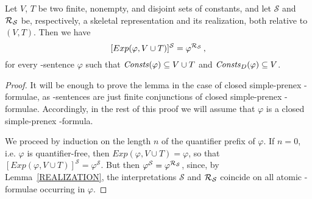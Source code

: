 \documentclass[a4paper]{llncs}
\newcommand{\HExp}{Exp}
\newcommand{\atset}{\mathcal{S}}
\newcommand{\DomConsts}{\Consts_D}
\begin{document}
\begin{lemma}\label{SKREAL}
Let $V$, $T$ be two finite, nonempty, and disjoint sets of constants, and let
$\atset$ and $\Realization_{\!\atset}$ be, respectively, a skeletal 
representation and
its realization, both relative to $(V,T)$.
Then we have
\[
  [\HExp(\varphi, V \cup T)]^{\atset} = \varphi^{\Realization_{\!\atset}} \,,
\]
for every \Forallpizero-sentence $\varphi$ such that 
$\mathit{Consts}(\varphi) \subseteq V \cup T$
and $\DomConsts(\varphi) \subseteq V$.
\end{lemma}
\begin{proof}
It will be enough to prove the lemma in the case of closed simple-prenex
\Forallpizero-formulae, as \Forallpizero-sentences are just
finite conjunctions of closed simple-prenex \Forallpizero-formulae.
Accordingly, in the rest of this proof we will assume that $\varphi$
is a closed simple-prenex \Forallpizero-formula.

We proceed by induction on the length $n$ of the quantifier prefix of 
$\varphi$. If $n=0$, i.e. $\varphi$ is quantifier-free,
then $\HExp(\varphi, V \cup T)=\varphi$, so that $[\HExp(\varphi, V 
\cup T)]^\atset =\varphi^\atset$.
But then $\varphi^\atset = \varphi^{\Realization_{\!\atset}}$, since, 
by Lemma~\ref{REALIZATION},
the interpretations $\atset$ and $\Realization_{\!\atset}$ coincide 
on all atomic \Forallpizero-formulae occurring in $\varphi$.



\end{proof}
\end{document}
